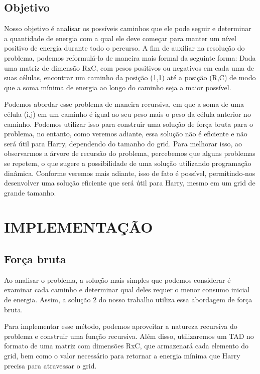 \documentclass[12pt]{article}
\begin{document}
        \subsection{Objetivo}
            Nosso objetivo é analisar os possíveis caminhos que ele pode seguir e 
            determinar a quantidade de energia com a qual ele deve começar para manter 
            um nível positivo de energia durante todo o percurso. A fim de auxiliar na 
            resolução do problema, podemos reformulá-lo de maneira mais formal da seguinte 
            forma:
            Dada uma matriz de dimensão RxC, com pesos positivos ou negativos em cada uma 
            de suas células, encontrar um caminho da posição (1,1) até a posição (R,C) de 
            modo que a soma mínima de energia ao longo do caminho seja a maior possível.

            Podemos abordar esse problema de maneira recursiva, em que a soma de uma 
            célula (i,j) em um caminho é igual ao seu peso mais o peso da célula anterior 
            no caminho. Podemos utilizar isso para construir uma solução de força bruta 
            para o problema, no entanto, como veremos adiante, essa solução não é eficiente 
            e não será útil para Harry, dependendo do tamanho do grid. Para melhorar isso, 
            ao observarmos a árvore de recursão do problema, percebemos que alguns problemas 
            se repetem, o que sugere a possibilidade de uma solução utilizando programação 
            dinâmica. Conforme veremos mais adiante, isso de fato é possível, permitindo-nos 
            desenvolver uma solução eficiente que será útil para Harry, mesmo em um grid de 
            grande tamanho.
     
    \newpage
    \section{IMPLEMENTAÇÃO}
        \subsection{Força bruta}
            Ao analisar o problema, a solução mais simples que podemos considerar é examinar 
            cada caminho e determinar qual deles requer o menor consumo inicial de energia. 
            Assim, a solução 2 do nosso trabalho utiliza essa abordagem de força bruta.

            Para implementar esse método, podemos aproveitar a natureza recursiva do problema 
            e construir uma função recursiva. Além disso, utilizaremos um TAD no formato de 
            uma matriz com dimensões RxC, que armazenará cada elemento do grid, bem como o 
            valor necessário para retornar a energia mínima que Harry precisa para atravessar 
            o grid.
            
\end{document}
